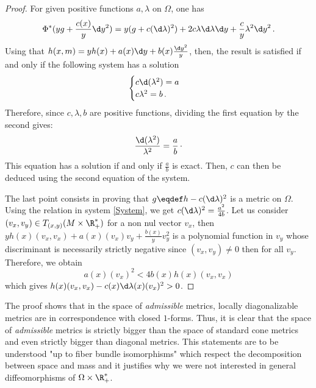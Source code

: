 \begin{proof}
For given positive functions $a, \lambda$ on $\Omega$, one has
\begin{equation}
\Phi^*(yg +  \frac{c(x)}{ y} \d y^2) = y (g + c (\d \lambda)^2) + 2c \lambda \d \lambda  \d y + \frac{c}{y} \lambda^2 \d y^2\,.
\end{equation}
Using that
$h(x,m) = y h(x) + a(x) \d y + b(x) \frac{\d y^2}{y}$,
then, the result is satisfied if and only if the following system  has a solution
\begin{equation}\label{System}
\begin{cases}
c  \d (\lambda^2)= a \\
c \lambda^2 =  b \,.
\end{cases}
\end{equation} 
Therefore, since $c, \lambda,b$ are positive functions, dividing the first equation by the second gives:
$$ \frac{\d (\lambda^2)}{\lambda^2} = \frac{a}{b}\,\cdot$$ 
This equation has a solution if and only if  $\frac{a}{b}$ is exact. Then, $c$ can then be deduced using the second equation of the system.

The last point consists in proving that $g \eqdef h - c (\d \lambda)^2 $ is a metric on $\Omega$. Using the relation in system \eqref{System}, we get 
$c  (\d \lambda)^2 = \frac{a^2}{4b}$. Let us consider $(v_x,v_y) \in T_{(x,y)}(M \times \R_+^*)$ for a non nul vector $v_x$, then $yh(x)(v_x,v_x) + a(x)(v_x)v_y + \frac{b(x)}{y}v_y^2$ is a polynomial function in $v_y$ whose discriminant is necessarily strictly negative since $(v_x,v_y) \neq 0$ then for all $v_y$. Therefore, we obtain 
\begin{equation}
a(x)(v_x)^2 < 4 b(x)h(x)(v_x,v_x)
\end{equation}
which gives $h(x)(v_x,v_x) - c(x) \d \lambda(x)(v_x)^2 > 0$.
\end{proof}

\begin{remark}
The proof shows that in the space of \textit{admissible} metrics, locally diagonalizable metrics are in correspondence with closed $1$-forms. Thus, it is clear that the space of \textit{admissible} metrics is strictly bigger than the space of standard cone metrics and even strictly bigger than diagonal metrics. This statements are to be understood "up to fiber bundle isomorphisms" which respect the decomposition between space and mass and it justifies why we were not interested in general diffeomorphisms of $\Omega \times \R^*_+$.
\end{remark}


